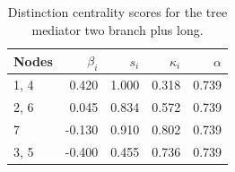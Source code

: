 \begin{table}
\centering
\caption{\label{tab:treemediator2l}Distinction centrality scores for the tree mediator two branch plus long.}
\centering
\begin{tabular}[t]{lrrrr}
\toprule
Nodes & $\beta_i$ & $s_i$ & $\kappa_i$ & $\alpha$\\
\midrule
1, 4 & 0.420 & 1.000 & 0.318 & 0.739\\
2, 6 & 0.045 & 0.834 & 0.572 & 0.739\\
7 & -0.130 & 0.910 & 0.802 & 0.739\\
3, 5 & -0.400 & 0.455 & 0.736 & 0.739\\
\bottomrule
\end{tabular}
\end{table}
